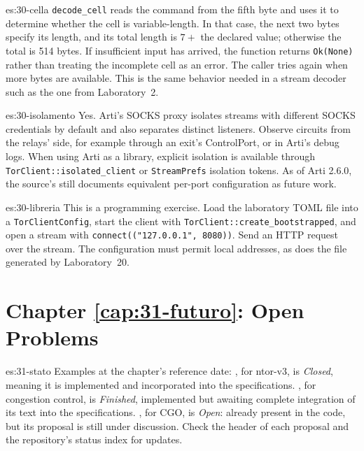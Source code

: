 \begin{soluzione}{es:30-cella}
\texttt{decode\_cell} reads the command from the fifth byte and uses it to determine whether the cell is variable-length. In that case, the next two bytes specify its length, and its total length is $7 +$ the declared value; otherwise the total is 514 bytes. If insufficient input has arrived, the function returns \texttt{Ok(None)} rather than treating the incomplete cell as an error. The caller tries again when more bytes are available. This is the same behavior needed in a stream decoder such as the one from Laboratory~2.
\end{soluzione}

\begin{soluzione}{es:30-isolamento}
Yes. Arti's SOCKS proxy isolates streams with different SOCKS credentials by default and also separates distinct listeners. Observe circuits from the relays' side, for example through an exit's ControlPort, or in Arti's debug logs. When using Arti as a library, explicit isolation is available through \texttt{TorClient::isolated\_client} or \texttt{StreamPrefs} isolation tokens. As of Arti 2.6.0, the source's  still documents equivalent per-port configuration as future work.
\end{soluzione}

\begin{soluzione}{es:30-libreria}
This is a programming exercise. Load the laboratory TOML file into a \texttt{TorClientConfig}, start the client with \texttt{TorClient::create\_bootstrapped}, and open a stream with \texttt{connect(("127.0.0.1", 8080))}. Send an HTTP request over the stream. The configuration must permit local addresses, as does the file generated by Laboratory~20.
\end{soluzione}

\section*{Chapter \ref{cap:31-futuro}: Open Problems}

\begin{soluzione}{es:31-stato}
Examples at the chapter's reference date: , for ntor-v3, is \emph{Closed}, meaning it is implemented and incorporated into the specifications. , for congestion control, is \emph{Finished}, implemented but awaiting complete integration of its text into the specifications. , for CGO, is \emph{Open}: already present in the code, but its proposal is still under discussion. Check the header of each proposal and the repository's status index for updates.
\end{soluzione}

